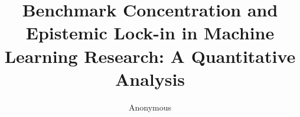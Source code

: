 \documentclass[letterpaper]{article}
\title{Benchmark Concentration and Epistemic Lock-in in Machine Learning Research: A Quantitative Analysis}
\author{Anonymous}
\date{}
\begin{document}
\maketitle

\begin{abstract}

\end{abstract}











\end{document}
